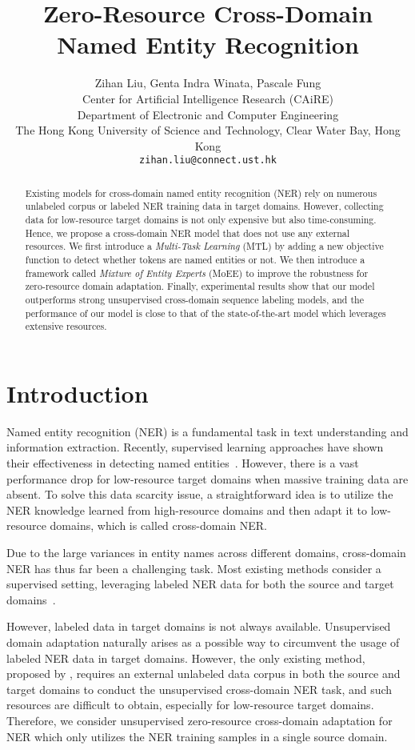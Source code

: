 \documentclass[11pt,a4paper]{article}
\title{Zero-Resource Cross-Domain Named Entity Recognition}
\author{Zihan Liu, Genta Indra Winata, Pascale Fung \\
Center for Artificial Intelligence Research (CAiRE)\\
Department of Electronic and Computer Engineering\\
The Hong Kong University of Science and Technology, Clear Water Bay, Hong Kong\\
\texttt{zihan.liu@connect.ust.hk}}
\date{}
\begin{document}
\maketitle
\begin{abstract}
Existing models for cross-domain named entity recognition (NER) rely on numerous unlabeled corpus or labeled NER training data in target domains. However, collecting data for low-resource target domains is not only expensive but also time-consuming. Hence, we propose a cross-domain NER model that does not use any external resources. We first introduce a \textit{Multi-Task Learning} (MTL) by adding a new objective function to detect whether tokens are named entities or not. We then introduce a framework called \textit{Mixture of Entity Experts} (MoEE) to improve the robustness for zero-resource domain adaptation. Finally, experimental results show that our model outperforms strong unsupervised cross-domain sequence labeling models, and the performance of our model is close to that of the state-of-the-art model which leverages extensive resources.
\end{abstract}

\section{Introduction}
Named entity recognition (NER) is a fundamental task in text understanding and information extraction. Recently, supervised learning approaches have shown their effectiveness in detecting named entities~\cite{ma2016end,chiu2016named,winata2019hierarchical}. However, there is a vast performance drop for low-resource target domains when massive training data are absent. To solve this data scarcity issue, a straightforward idea is to utilize the NER knowledge learned from high-resource domains and then adapt it to low-resource domains, which is called cross-domain NER. 

Due to the large variances in entity names across different domains, cross-domain NER has thus far been a challenging task. Most existing methods consider a supervised setting, leveraging labeled NER data for both the source and target domains~\cite{yang2017transfer, lin2018neural}.

However, labeled data in target domains is not always available.
Unsupervised domain adaptation naturally arises as a possible way to circumvent the usage of labeled NER data in target domains.
However, the only existing method, proposed by \citet{jia2019cross}, requires an external unlabeled data corpus in both the source and target domains to conduct the unsupervised cross-domain NER task, and such resources are difficult to obtain, especially for low-resource target domains. Therefore, we consider unsupervised zero-resource cross-domain adaptation for NER which only utilizes the NER training samples in a single source domain.
\end{document}
